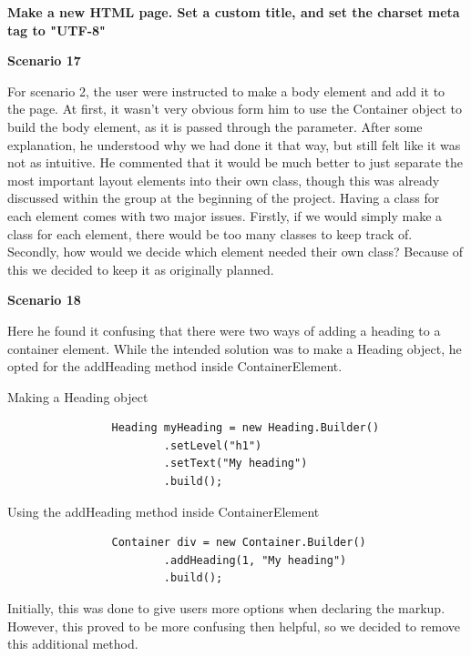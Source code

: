 \documentclass[12pt]{article}
\begin{document}
        \textbf{Make a new HTML page. Set a custom title, and set the charset meta tag to "UTF-8"}

        \textbf{Scenario 17}

        For scenario 2, the user were instructed to make a body element and add it to the page. At first, it wasn't very obvious form him to use the Container object to build the body element, as it is passed through the parameter. After some explanation, he understood why we had done it that way, but still felt like it was not as intuitive. He commented that it would be much better to just separate the most important layout elements into their own class, though this was already discussed within the group at the beginning of the project. Having a class for each element comes with two major issues. Firstly, if we would simply make a class for each element, there would be too many classes to keep track of. Secondly, how would we decide which element needed their own class? Because of this we decided to keep it as originally planned.

        \textbf{Scenario 18}

        Here he found it confusing that there were two ways of adding a heading to a container element. While the intended solution was to make a Heading object, he opted for the addHeading method inside ContainerElement.

        \begin{shaded}
            Making a Heading object

            \begin{lstlisting}
                Heading myHeading = new Heading.Builder()
                        .setLevel("h1")
                        .setText("My heading")
                        .build();
            \end{lstlisting}

            Using the addHeading method inside ContainerElement

            \begin{lstlisting}
                Container div = new Container.Builder()
                        .addHeading(1, "My heading")
                        .build();
            \end{lstlisting}
        \end{shaded}

        Initially, this was done to give users more options when declaring the markup. However, this proved to be more confusing then helpful, so we decided to remove this additional method.
\end{document}
